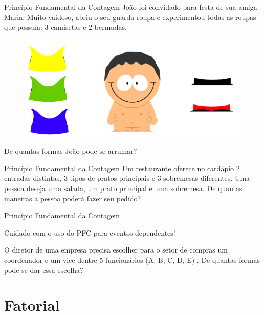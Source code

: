 \documentclass[aspectratio=169,xcolor=dvipsnames]{beamer}
\begin{document}
\begin{frame}{Princípio Fundamental da Contagem}
    João foi convidado para festa de sua amiga Maria. Muito vaidoso, abriu o seu guarda-roupa e experimentou todas as roupas que possuía:  3 camisetas e 2 bermudas.
      \begin{figure}[htb!]
        \centering
        \includegraphics[width=.5\linewidth]{images/im1.png}
      \end{figure}
    De quantas formas João pode se arrumar?

\end{frame}


\begin{frame}[t]{Princípio Fundamental da Contagem}
    Um restaurante oferece no cardápio 2 entradas distintas, 3 tipos de pratos principais e 3 sobremesas diferentes.
    Uma pessoa deseja uma salada, um prato principal e uma sobremesa. De quantas maneiras a pessoa
    poderá fazer seu pedido?
\end{frame}



\begin{frame}[t]{Princípio Fundamental da Contagem}
    \begin{center}
        Cuidado com o uso do PFC para eventos dependentes!
    \end{center}
    O diretor de uma empresa precisa escolher para o setor de compras um coordenador e um vice dentre 5 funcionários (A, B, C, D, E) . De quantas formas pode se dar essa escolha?
\end{frame}


\section{Fatorial}
\end{document}
